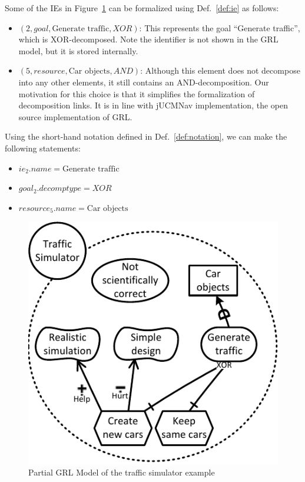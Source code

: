 Some of the IEs in Figure~\ref{fig:example-small2} can be formalized using Def.~\ref{def:ie} as follows:
\begin{itemize}
\item $(2, goal, \text{Generate traffic}, XOR)$: This represents the goal ``Generate traffic'', which is XOR-decomposed. Note the identifier is not shown in the GRL model, but it is stored internally.
\item $(5, resource, \text{Car objects}, AND)$: Although this element does not decompose into any other elements, it still contains an AND-decomposition. Our motivation for this choice is that it simplifies the formalization of decomposition links. It is in line with jUCMNav implementation, the open source implementation of GRL.
\end{itemize}

Using the short-hand notation defined in Def.~\ref{def:notation}, we can make the following statements:
\begin{itemize}
\item $ie_2.name = \text{Generate traffic}$
\item $goal_2.decomptype = XOR$
\item $resource_5.name = \text{Car objects}$
\end{itemize}

\begin{figure}[ht]
\centering
\includegraphics[width=\columnwidth]{img/Example1.pdf}
\caption{Partial GRL Model of the traffic simulator example}
\label{fig:example-small2}
\end{figure} 

